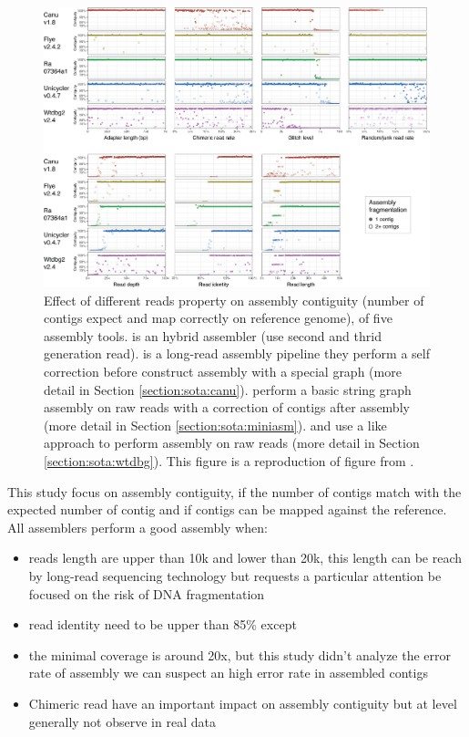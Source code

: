\documentclass[main.tex]{subfiles}
\begin{document}
\begin{figure}
    \centering
    \includegraphics[width=\textwidth]{introduction/images/rrwick_bench.png}
    \caption{Effect of different reads property on assembly contiguity (number of contigs expect and map correctly on reference genome), of five assembly tools.  is an hybrid assembler (use second and thrid generation read). \canu is a long-read assembly pipeline they perform a self correction before construct assembly with a special \OLC graph (more detail in Section \ref{section:sota:canu}).  perform a basic string graph assembly on raw reads with a correction of contigs after assembly (more detail in Section \ref{section:sota:miniasm}). \wtdbg and  use a \DBG like approach to perform assembly on raw reads (more detail in Section \ref{section:sota:wtdbg}). This figure is a reproduction of figure from \cite{long_read_assembler_comparison}.}
    \label{intro:fig:rrwick_bench}
\end{figure}

This study focus on  assembly contiguity, if the number of contigs match with the expected number of contig and if  contigs can be mapped against the reference. %
All assemblers perform a good assembly when:%
\begin{itemize}
    \item reads length are upper than 10k and lower than 20k, this length can be reach by long-read sequencing technology but requests a particular attention be focused on the risk of DNA fragmentation%
    \item read identity need to be upper than 85\% except %
    \item the minimal coverage is around 20x, but this study didn't analyze the error rate of assembly we can suspect an high error rate in assembled contigs%
    \item Chimeric read have an important impact on assembly contiguity but at level generally not observe in real data %
\end{itemize}
\end{document}
